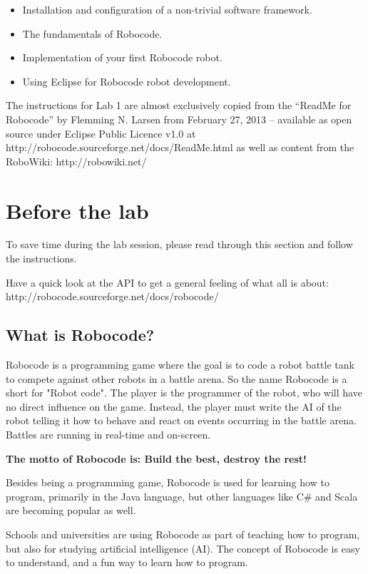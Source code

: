 \documentclass{scrreprt}
\begin{document}
\begin{itemize}
\item Installation and configuration of a non-trivial software framework.
\item The fundamentals of Robocode.
\item Implementation of your first Robocode robot.
\item Using Eclipse for Robocode robot development.
\end{itemize}

The instructions for Lab 1 are almost exclusively copied from the ``ReadMe for Robocode'' by Flemming N. Larsen from February 27, 2013 -- available as open source under Eclipse Public Licence v1.0 at http://robocode.sourceforge.net/docs/ReadMe.html as well as content from the RoboWiki: http://robowiki.net/

\chapter{Before the lab}
To save time during the lab session, please read through this section and follow the instructions.

Have a quick look at the API to get a general feeling of what all is about:\\ 
http://robocode.sourceforge.net/docs/robocode/

\section{What is Robocode?}
Robocode is a programming game where the goal is to code a robot battle tank to compete against other robots in a battle arena. So the name Robocode is a short for "Robot code". The player is the programmer of the robot, who will have no direct influence on the game. Instead, the player must write the AI of the robot telling it how to behave and react on events occurring in the battle arena. Battles are running in real-time and on-screen.

\begin{center}
\textbf{The motto of Robocode is: Build the best, destroy the rest!}
\end{center}

Besides being a programming game, Robocode is used for learning how to program, primarily in the Java language, but other languages like C\# and Scala are becoming popular as well.

Schools and universities are using Robocode as part of teaching how to program, but also for studying artificial intelligence (AI). The concept of Robocode is easy to understand, and a fun way to learn how to program.
\end{document}

